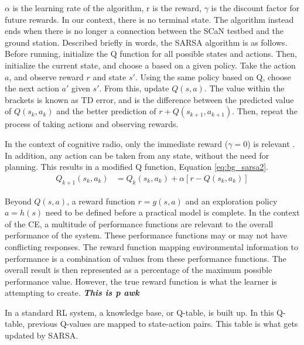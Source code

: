 		\par $\alpha$ is the learning rate of the algorithm, r is the reward, $\gamma$ is the discount factor for future rewards. In our context, there is no terminal state. The algorithm instead ends when there is no longer a connection between the SCaN testbed and the ground station. Described briefly in words, the SARSA algorithm is as follows. Before running, initialize the Q function for all possible states and actions. Then, initialize the current state, and choose a based on a given policy. Take the action $a$, and observe reward $r$ and state $s'$. Using the same policy based on Q, choose the next action $a'$ given $s'$. From this, update $Q(s,a)$. The value within the brackets is known as TD error, and is the difference between the predicted value of $Q(s_k,a_k)$ and the better prediction of $r + Q(s_{k+1},a_{k+1})$. Then, repeat the process of taking actions and observing rewards. 
	\par In the context of cognitive radio, only the immediate reward ($\gamma = 0$) is relevant \cite{AIAA_Paper}. In addition, any action can be taken from any state, without the need for planning. This results in a modified Q function, Equation \ref{eq:bg_sarsa2}.
	\begin{align}
		Q_{k+1}(s_k,a_k) &= Q_k(s_k,a_k) + \alpha[r - Q(s_k,a_k)] \label{eq:bg_sarsa2}
	\end{align}
	\par Beyond $Q(s,a)$, a reward function $r = g(s,a)$ and an exploration policy $a = h(s)$ need to be defined before a practical model is complete. In the context of the CE, a multitude of performance functions are relevant to the overall performance of the system. These performance functions may or may not have conflicting responses. The reward function mapping environmental information to performance is a combination of values from these performance functions. The overall result is then represented as a percentage of the maximum possible performance value. However, the true reward function is what the learner is attempting to create. \textbf{\textit{ This is p awk}}  
	\par In a standard RL system, a knowledge base, or Q-table, is built up. In this Q-table, previous Q-values are mapped to state-action pairs. This table is what gets updated by SARSA. 
	
